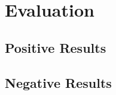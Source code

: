 \documentclass[manuscript,screen,review,anonymous]{acmart}
\begin{document}
\section{Evaluation}








\subsection{Positive Results}






\subsection{Negative Results}
\end{document}
